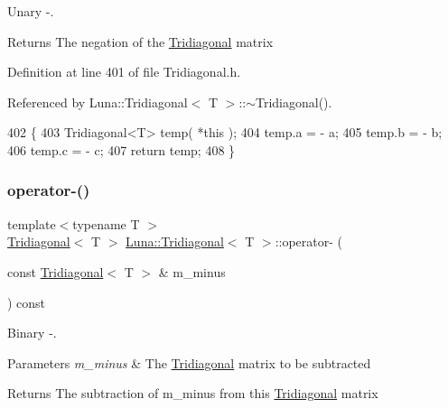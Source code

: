 Unary -\/. 

\begin{DoxyReturn}{Returns}
The negation of the \hyperlink{classLuna_1_1Tridiagonal}{Tridiagonal} matrix 
\end{DoxyReturn}


Definition at line 401 of file Tridiagonal.\+h.



Referenced by Luna\+::\+Tridiagonal$<$ T $>$\+::$\sim$\+Tridiagonal().


\begin{DoxyCode}
402   \{
403     Tridiagonal<T> temp( *\textcolor{keyword}{this} );
404     temp.a = - a;
405     temp.b = - b;
406     temp.c = - c;
407     \textcolor{keywordflow}{return} temp;
408   \}
\end{DoxyCode}
\mbox{\label{classLuna_1_1Tridiagonal_ada353bc1778051728e37403d71f57a34}} 
\subsubsection{\texorpdfstring{operator-\/()}{operator-()}\hspace{0.1cm}{\footnotesize\ttfamily [2/2]}}
{\footnotesize\ttfamily template$<$typename T $>$ \\
\hyperlink{classLuna_1_1Tridiagonal}{Tridiagonal}$<$ T $>$ \hyperlink{classLuna_1_1Tridiagonal}{Luna\+::\+Tridiagonal}$<$ T $>$\+::operator-\/ (\begin{DoxyParamCaption}\item[{const \hyperlink{classLuna_1_1Tridiagonal}{Tridiagonal}$<$ T $>$ \&}]{m\+\_\+minus }\end{DoxyParamCaption}) const\hspace{0.3cm}{\ttfamily [inline]}}



Binary -\/. 


\begin{DoxyParams}{Parameters}
{\em m\+\_\+minus} & The \hyperlink{classLuna_1_1Tridiagonal}{Tridiagonal} matrix to be subtracted \\
\hline
\end{DoxyParams}
\begin{DoxyReturn}{Returns}
The subtraction of m\+\_\+minus from this \hyperlink{classLuna_1_1Tridiagonal}{Tridiagonal} matrix 
\end{DoxyReturn}


